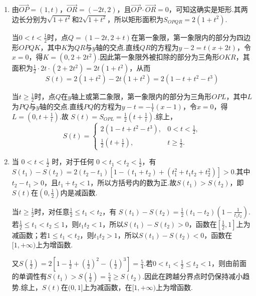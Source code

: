 \begin{solution}
\begin{enumerate}
\item 由\(\overrightarrow{OP}=(1,t)\)，\(\overrightarrow{OR}=(-2t,2)\)，且\(\overrightarrow{OP}\cdot\overrightarrow{OR}=0\)，可知这确实是矩形.其两边长分别为\(\sqrt{1+t^2}\)和\(2\sqrt{1+t^2}\)，所以矩形面积为\(S_{OPQR}=2(1+t^2)\).

当\(0<t<\frac12\)时，点\(Q=(1-2t,2+t)\)在第一象限，第一象限内的部分为四边形\(OPQK\)，其中\(K\)为\(QR\)与\(y\)轴的交点.直线\(QR\)的方程为\(y-2=t(x+2t)\)，令\(x=0\)，得\(K=(0,2+2t^2)\).因此第一象限外被扣除的部分为三角形\(OKR\)，其面积为\(\frac12\cdot2t\cdot(2+2t^2)=2t(1+t^2)\)，从而
\[
S(t)=2(1+t^2)-2t(1+t^2)=2(1-t+t^2-t^3)
\]

当\(t\geqslant\frac12\)时，点\(Q\)在\(y\)轴上或第二象限，第一象限内的部分为三角形\(OPL\)，其中\(L\)为\(PQ\)与\(y\)轴的交点.直线\(PQ\)的方程为\(y-t=-\frac1t(x-1)\)，令\(x=0\)，得\(L=\left(0,t+\frac1t\right)\).故
\(S(t)=S_{OPL}=\frac12\left(t+\frac1t\right)\).综上，
\[
S(t)=
\begin{cases}
2(1-t+t^2-t^3),&0<t<\frac12,\\
\frac12\left(t+\frac1t\right),&t\geqslant\frac12.
\end{cases}
\]

\item 当 \(0 < t < \frac{1}{2}\) 时，对于任何 \(0 < t_1 < t_2 < \frac{1}{2}\)，有
\(S(t_1)-S(t_2)=2(t_2-t_1)\left[1-(t_1+t_2)+(t_1^2+t_1t_2+t_2^2)\right]>0\).其中\(t_2-t_1>0\)，且\(t_1+t_2<1\)，所以方括号内的数为正.故\(S(t_1)>S(t_2)\)，即\(S(t)\)在\(\left(0,\frac12\right)\)内是减函数.

当\(t\geqslant\frac12\)时，对任意\(\frac12\leqslant t_1<t_2\)，有
\(S(t_1)-S(t_2)=\frac12(t_1-t_2)\left(1-\frac{1}{t_1t_2}\right)\).若\(\frac12\leqslant t_1<t_2\leqslant1\)，则\(t_1t_2<1\)，所以\(S(t_1)-S(t_2)>0\)，函数在\(\left[\frac12,1\right]\)上为减函数；若\(1\leqslant t_1<t_2\)，则\(t_1t_2>1\)，所以\(S(t_1)-S(t_2)<0\)，函数在\([1,+\infty)\)上为增函数.

又\(S\left(\frac12\right)=2\left[1-\frac12+\left(\frac12\right)^2-\left(\frac12\right)^3\right]=\frac54\).若\(0<t_1<\frac12\leqslant t_2<1\)，则由前面的单调性有\(S(t_1)>S\left(\frac12\right)=\frac54\geqslant S(t_2)\).因此在跨越分界点时仍保持减小趋势.综上，\(S(t)\)在\((0,1]\)上为减函数，在\([1,+\infty)\)上为增函数.
\end{enumerate}
\end{solution}

